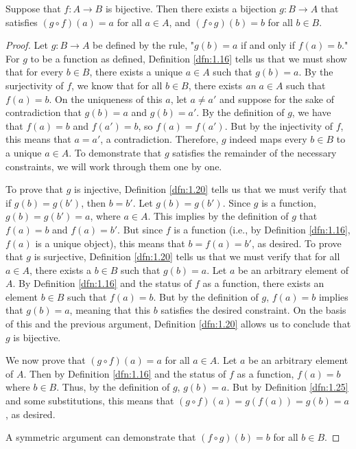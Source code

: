 \documentclass[../main.tex]{subfiles}
\begin{document}
\begin{proposition}\label{prp:1.27}
    Suppose that $f:A\to B$ is bijective. Then there exists a bijection $g:B\to A$ that satisfies $(g\circ f)(a)=a$ for all $a\in A$, and $(f\circ g)(b)=b$ for all $b\in B$.
    \begin{proof}
        Let $g:B\to A$ be defined by the rule, "$g(b)=a$ if and only if $f(a)=b$." For $g$ to be a function as defined, Definition \ref{dfn:1.16} tells us that we must show that for every $b\in B$, there exists a unique $a\in A$ such that $g(b)=a$. By the surjectivity of $f$, we know that for all $b\in B$, there exists \emph{an} $a\in A$ such that $f(a)=b$. On the uniqueness of this $a$, let $a\neq a'$ and suppose for the sake of contradiction that $g(b)=a$ and $g(b)=a'$. By the definition of $g$, we have that $f(a)=b$ and $f(a')=b$, so $f(a)=f(a')$. But by the injectivity of $f$, this means that $a=a'$, a contradiction. Therefore, $g$ indeed maps every $b\in B$ to a unique $a\in A$. To demonstrate that $g$ satisfies the remainder of the necessary constraints, we will work through them one by one.\par
        To prove that $g$ is injective, Definition \ref{dfn:1.20} tells us that we must verify that if $g(b)=g(b')$, then $b=b'$. Let $g(b)=g(b')$. Since $g$ is a function, $g(b)=g(b')=a$, where $a\in A$. This implies by the definition of $g$ that $f(a)=b$ and $f(a)=b'$. But since $f$ is a function (i.e., by Definition \ref{dfn:1.16}, $f(a)$ is a unique object), this means that $b=f(a)=b'$, as desired. To prove that $g$ is surjective, Definition \ref{dfn:1.20} tells us that we must verify that for all $a\in A$, there exists a $b\in B$ such that $g(b)=a$. Let $a$ be an arbitrary element of $A$. By Definition \ref{dfn:1.16} and the status of $f$ as a function, there exists an element $b\in B$ such that $f(a)=b$. But by the definition of $g$, $f(a)=b$ implies that $g(b)=a$, meaning that this $b$ satisfies the desired constraint. On the basis of this and the previous argument, Definition \ref{dfn:1.20} allows us to conclude that $g$ is bijective.\par
        We now prove that $(g\circ f)(a)=a$ for all $a\in A$. Let $a$ be an arbitrary element of $A$. Then by Definition \ref{dfn:1.16} and the status of $f$ as a function, $f(a)=b$ where $b\in B$. Thus, by the definition of $g$, $g(b)=a$. But by Definition \ref{dfn:1.25} and some substitutions, this means that $(g\circ f)(a)=g(f(a))=g(b)=a$, as desired.\par
        A symmetric argument can demonstrate that $(f\circ g)(b)=b$ for all $b\in B$.
    \end{proof}
\end{proposition}
\end{document}
